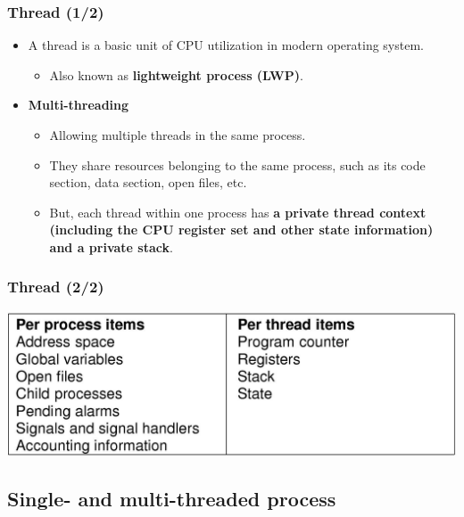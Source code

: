 \documentclass[CJKutf8,xcolor=pdftex,dvipsnames,table]{beamer}
\begin{document}
\begin{CJK*}{UTF8}{song}
  \begin{frame}
  \frametitle{Thread (1/2)} \pause
  \begin{itemize}
  \item{A thread is a basic unit of CPU utilization in modern operating system.} \pause
    \begin{itemize}
    \item{Also known as \textbf{lightweight process (LWP)}.}  \pause
    \end{itemize}
  \item{\textbf{Multi-threading}} \pause
    \begin{itemize}
    \item{Allowing multiple threads in the same process.} \pause
    \item{They share resources belonging to the same process, such as its code section, data section, open files, etc.} \pause
    \item{But, each thread within one process has \textbf{a private thread context (including the CPU register set and other state information) and a private stack}.}
    \end{itemize}
  \end{itemize}
  \end{frame}

  \begin{frame}
  \frametitle{Thread (2/2)} \pause
  \begin{center}
    \includegraphics[scale=0.2]{mosv2f2-7}
  \end{center}
  \end{frame}

  \subsection{Single- and multi-threaded process}


\end{CJK*}
\end{document}
